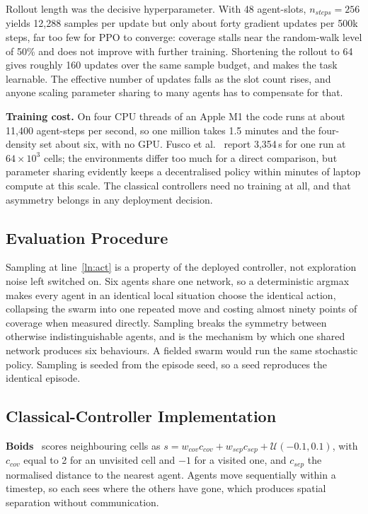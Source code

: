 \documentclass[a4paper, 10pt, conference]{ieeeconf}
\begin{document}
Rollout length was the decisive hyperparameter. With 48 agent-slots,
$n_{steps}=256$ yields 12{,}288 samples per update but only about
forty gradient updates per 500k steps, far too few for PPO to
converge: coverage stalls near the random-walk level of 50\% and does
not improve with further training. Shortening the rollout to 64 gives
roughly 160 updates over the same sample budget, and makes the task
learnable. The effective number of updates falls as the slot count
rises, and anyone scaling parameter sharing to many agents has to
compensate for that.

\textbf{Training cost.} On four CPU threads of an Apple M1 the code
runs at about 11{,}400 agent-steps per second, so one million takes
1.5 minutes and the four-density set about six, with no GPU. Fusco et
al.~\cite{fusco2025} report 3{,}354\,s for one run at $64\times10^3$
cells; the environments differ too much for a direct comparison, but
parameter sharing evidently keeps a decentralised policy within
minutes of laptop compute at this scale. The classical controllers
need no training at all, and that asymmetry belongs in any deployment
decision.

\subsection{Evaluation Procedure}\label{sec:eval}

Sampling at line~\ref{ln:act} is a property of the deployed
controller, not exploration noise left switched on. Six agents share
one network, so a deterministic argmax makes every agent in an
identical local situation choose the identical action, collapsing the
swarm into one repeated move and costing almost ninety points of
coverage when measured directly. Sampling breaks the symmetry between
otherwise indistinguishable agents, and is the mechanism by which one
shared network produces six behaviours. A fielded swarm would run the
same stochastic policy. Sampling is seeded from the episode seed, so a
seed reproduces the identical episode.

\subsection{Classical-Controller Implementation}\label{sec:classical}

\textbf{Boids}~\cite{reynolds1987} scores neighbouring cells as $s =
w_{cov}c_{cov} + w_{sep}c_{sep} + \mathcal{U}(-0.1,0.1)$, with
$c_{cov}$ equal to 2 for an unvisited cell and $-1$ for a visited one,
and $c_{sep}$ the normalised distance to the nearest agent. Agents
move sequentially within a timestep, so each sees where the others
have gone, which produces spatial separation without communication.
\end{document}
